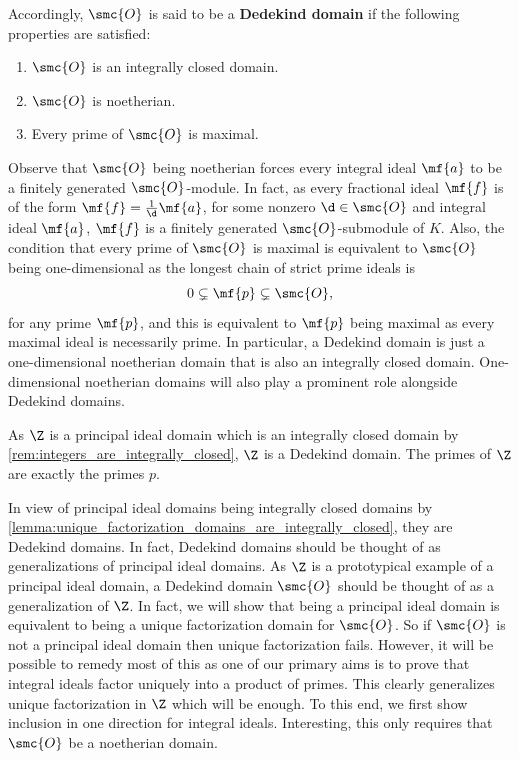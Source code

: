 \documentclass[12pt]{article}
\begin{document}
      Accordingly, \(\smc{O}\) is said to be a \textbf{Dedekind domain} if the following properties are satisfied:
      \begin{enumerate}[label*=(\roman*)]
        \item \(\smc{O}\) is an integrally closed domain.
        \item \(\smc{O}\) is noetherian.
        \item Every prime of \(\smc{O}\) is maximal.
      \end{enumerate}
      Observe that \(\smc{O}\) being noetherian forces every integral ideal \(\mf{a}\) to be a finitely generated \(\smc{O}\)-module. In fact, as every fractional ideal \(\mf{f}\) is of the form \(\mf{f} = \frac{1}{\d}\mf{a}\), for some nonzero \(\d \in \smc{O}\) and integral ideal \(\mf{a}\), \(\mf{f}\) is a finitely generated \(\smc{O}\)-submodule of \(K\). Also, the condition that every prime of \(\smc{O}\) is maximal is equivalent to \(\smc{O}\) being one-dimensional as the longest chain of strict prime ideals is
      \[
        0 \subsetneq \mf{p} \subsetneq \smc{O},
      \]
      for any prime \(\mf{p}\), and this is equivalent to \(\mf{p}\) being maximal as every maximal ideal is necessarily prime. In particular, a Dedekind domain is just a one-dimensional noetherian domain that is also an integrally closed domain. One-dimensional noetherian domains will also play a prominent role alongside Dedekind domains.

      \begin{remark}
        As \(\Z\) is a principal ideal domain which is an integrally closed domain by \cref{rem:integers_are_integrally_closed}, \(\Z\) is a Dedekind domain. The primes of \(\Z\) are exactly the primes \(p\).
      \end{remark}
      
      In view of principal ideal domains being integrally closed domains by \cref{lemma:unique_factorization_domains_are_integrally_closed}, they are Dedekind domains. In fact, Dedekind domains should be thought of as generalizations of principal ideal domains. As \(\Z\) is a prototypical example of a principal ideal domain, a Dedekind domain \(\smc{O}\) should be thought of as a generalization of \(\Z\). In fact, we will show that being a principal ideal domain is equivalent to being a unique factorization domain for \(\smc{O}\). So if \(\smc{O}\) is not a principal ideal domain then unique factorization fails. However, it will be possible to remedy most of this as one of our primary aims is to prove that integral ideals factor uniquely into a product of primes. This clearly generalizes unique factorization in \(\Z\) which will be enough. To this end, we first show inclusion in one direction for integral ideals. Interesting, this only requires that \(\smc{O}\) be a noetherian domain.
\end{document}
